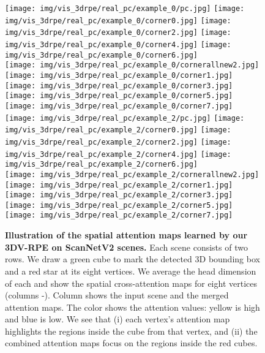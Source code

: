 \documentclass[10pt,twocolumn,letterpaper]{article}
\begin{document}
\begin{figure*}[t]
\texttt{[image: img/vis\_3drpe/real\_pc/example\_0/pc.jpg]}
\hfill
\texttt{[image: img/vis\_3drpe/real\_pc/example\_0/corner0.jpg]}
\hfill
\texttt{[image: img/vis\_3drpe/real\_pc/example\_0/corner2.jpg]}
\hfill
\texttt{[image: img/vis\_3drpe/real\_pc/example\_0/corner4.jpg]}
\hfill
\texttt{[image: img/vis\_3drpe/real\_pc/example\_0/corner6.jpg]}
\hfill
\\
\texttt{[image: img/vis\_3drpe/real\_pc/example\_0/cornerallnew2.jpg]} 
\hfill
\texttt{[image: img/vis\_3drpe/real\_pc/example\_0/corner1.jpg]}  
\hfill
\texttt{[image: img/vis\_3drpe/real\_pc/example\_0/corner3.jpg]}
\hfill
\texttt{[image: img/vis\_3drpe/real\_pc/example\_0/corner5.jpg]}
\hfill
\texttt{[image: img/vis\_3drpe/real\_pc/example\_0/corner7.jpg]}  \\
\vspace{10mm}
\texttt{[image: img/vis\_3drpe/real\_pc/example\_2/pc.jpg]}
\hfill
\texttt{[image: img/vis\_3drpe/real\_pc/example\_2/corner0.jpg]}
\hfill
\texttt{[image: img/vis\_3drpe/real\_pc/example\_2/corner2.jpg]}
\hfill
\texttt{[image: img/vis\_3drpe/real\_pc/example\_2/corner4.jpg]}
\hfill
\texttt{[image: img/vis\_3drpe/real\_pc/example\_2/corner6.jpg]}
\hfill
\\
\texttt{[image: img/vis\_3drpe/real\_pc/example\_2/cornerallnew2.jpg]} 
\hfill
\texttt{[image: img/vis\_3drpe/real\_pc/example\_2/corner1.jpg]}  
\hfill
\texttt{[image: img/vis\_3drpe/real\_pc/example\_2/corner3.jpg]}
\hfill
\texttt{[image: img/vis\_3drpe/real\_pc/example\_2/corner5.jpg]}
\hfill
\texttt{[image: img/vis\_3drpe/real\_pc/example\_2/corner7.jpg]}  \\
\vspace{5mm}
\caption{\small{
\textbf{Illustration of the spatial attention maps learned by our 3DV-RPE on ScanNetV2 scenes.} Each scene consists of two rows. We draw a green cube to mark the detected 3D bounding box and a red star at its eight vertices. We average the head dimension of each  and show the spatial cross-attention maps for eight vertices (columns -). Column  shows the input scene and the merged attention maps. The color shows the attention values: yellow is high and blue is low. We see that (i) each vertex's attention map highlights the regions inside the cube from that vertex, and (ii) the combined attention maps focus on the regions inside the red cubes.}}
\label{fig:3dvrpe_visual_exp}
\end{figure*}
\end{document}
